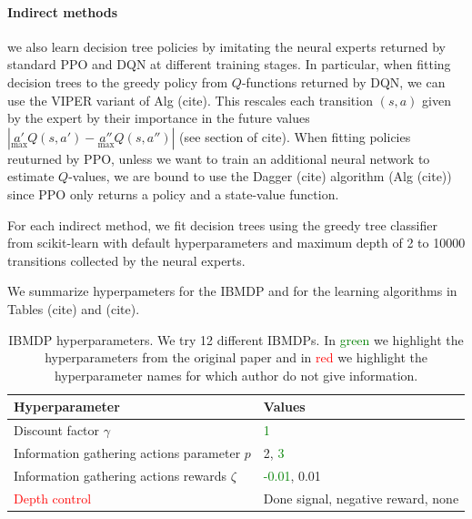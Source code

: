 \paragraph{Indirect methods} we also learn decision tree policies by imitating the neural experts returned by standard PPO and DQN at different training stages.
In particular, when fitting decision trees to the greedy policy from $Q$-functions returned by DQN, we can use the VIPER variant of Alg (cite). This rescales each transition $(s, a)$ given by the expert by their importance in the future values $|\underset{\max}{a'}Q(s, a') - \underset{\max}{a''}Q(s, a'')|$ (see section of cite).
When fitting policies reuturned by PPO, unless we want to train an additional neural network to estimate $Q$-values, we are bound to use the Dagger (cite) algorithm (Alg (cite)) since PPO only returns a policy and a state-value function.

For each indirect method, we fit decision trees using the greedy tree classifier from scikit-learn with default hyperparameters and maximum depth of 2 to 10000 transitions collected by the neural experts.

We summarize hyperpameters for the IBMDP and for the learning algorithms in Tables (cite) and (cite).

\begin{table}[h]
    \centering
    \caption{IBMDP hyperparameters. We try 12 different IBMDPs. In \textcolor{green}{green} we highlight the hyperparameters from the original paper and in \textcolor{red}{red} we highlight the hyperparameter names for which author do not give information.}
    \begin{tabular}{ll}
    \toprule
    \textbf{Hyperparameter} & \textbf{Values}\\
    \midrule
    Discount factor $\gamma$ & \textcolor{green}{1} \\
    Information gathering actions parameter $p$ & 2, \textcolor{green}{3} \\
    Information gathering actions rewards $\zeta$ & \textcolor{green}{-0.01}, 0.01 \\
    \textcolor{red}{Depth control} & Done signal, negative reward, none \\ 
    \bottomrule
    \end{tabular}
    \end{table}


